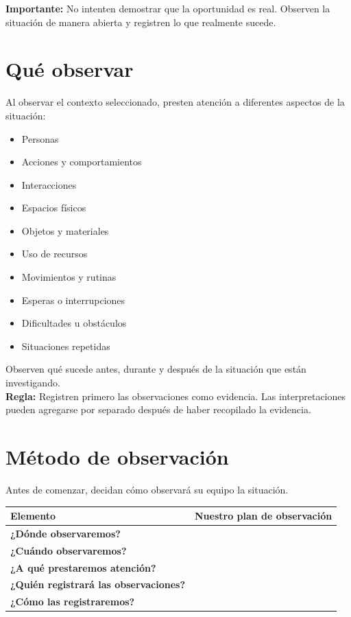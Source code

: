 \documentclass[12pt,a4paper]{article}
\begin{document}
	\vspace{0.2cm}
	
	\textbf{Importante:} No intenten demostrar que la oportunidad es real. Observen la situación de manera abierta y registren lo que realmente sucede.
	
	\section*{Qué observar}
	
	Al observar el contexto seleccionado, presten atención a diferentes aspectos de la situación:
	
	\begin{multicols}{2}
		\begin{itemize}[leftmargin=0.6cm,itemsep=0pt]
			\item Personas
			\item Acciones y comportamientos
			\item Interacciones
			\item Espacios físicos
			\item Objetos y materiales
			\item Uso de recursos
			\item Movimientos y rutinas
			\item Esperas o interrupciones
			\item Dificultades u obstáculos
			\item Situaciones repetidas
		\end{itemize}
	\end{multicols}
	
	Observen qué sucede antes, durante y después de la situación que están investigando. \\
	
	
	\textbf{Regla:} Registren primero las observaciones como evidencia. Las interpretaciones pueden agregarse por separado después de haber recopilado la evidencia.
	
	\section*{Método de observación}
	
	Antes de comenzar, decidan cómo observará su equipo la situación.
	
	\begin{center}
		\small
		\begin{tabular}{|L{0.30\textwidth}|L{0.55\textwidth}|}
			\hline
			\textbf{Elemento} & \textbf{Nuestro plan de observación} \\
			\hline
			\textbf{¿Dónde observaremos?} & \rule{0pt}{0.55cm} \\
			\hline
			\textbf{¿Cuándo observaremos?} & \rule{0pt}{0.55cm} \\
			\hline
			\textbf{¿A qué prestaremos atención?} & \rule{0pt}{0.7cm} \\
			\hline
			\textbf{¿Quién registrará las observaciones?} & \rule{0pt}{0.55cm} \\
			\hline
			\textbf{¿Cómo las registraremos?} & \rule{0pt}{0.55cm} \\
			\hline
		\end{tabular}
	\end{center}
	
\end{document}

